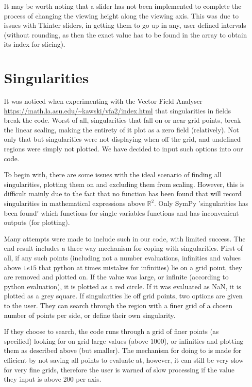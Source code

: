 \documentclass[12pt]{report}
\begin{document}
It may be worth noting that a slider has not been implemented to complete the process of changing the viewing height along the viewing axis. This was  due to issues with Tkinter sliders, in getting them to go up in any, user defined intervals (without rounding, as then the exact value has to be found in the array to obtain its index for slicing).

\chapter{Singularities}
It was noticed when experimenting with the Vector Field Analyser \url{https://math.la.asu.edu/~kawski/vfa2/index.html} that singularities in fields break the code. Worst of all, singularities that fall on or near grid points, break the linear scaling, making the entirety of it plot as a zero field (relatively). Not only that but singularities were not displaying when off the grid, and undefined regions were simply not plotted. We have decided to input such options into our code.

To begin with, there are some issues with the ideal scenario of finding all singularities, plotting them on and excluding them from scaling. However, this is difficult mainly due to the fact that no function has been found that will record singularities in mathematical expressions above $\mathbb{R}^{2}$. Only SymPy 'singularities has been found' which functions for single variables functions and has inconvenient outputs (for plotting).

Many attempts were made to include such in our code, with limited success.
The end result includes a three way mechanism for coping with singularities.
First of all, if any such points (including not a number evaluations, infinities and values above $1e15$ that python at times mistakes for infinities) lie on a grid point, they are removed and plotted on. If the value was large, or infinite (according to python evaluation), it is plotted as a red circle. If it was evaluated as NaN, it is plotted as a grey square.
If singularities lie off grid points, two options are given to the user. They can search through the region with a finer grid of a chosen number of points per side, or define their own singularity.

If they choose to search, the code runs through a grid of finer points (as specified) looking for on grid large values (above $1000$), or infinities and plotting them as described above (but smaller). The mechanism for doing to is made for efficient by not saving all points to evaluate at, however, it can still be very slow for very fine grids, therefore the user is warned of slow processing if the value they input is above $200$ per axis.
\end{document}
